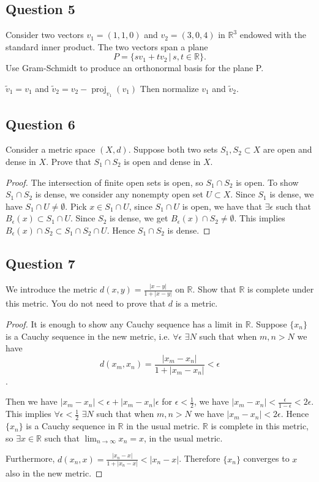 \documentclass{tufte-book}
\DeclareMathOperator{\proj}{proj}
\theoremstyle{mytheoremstyle}
\theoremstyle{mylemstyle}
\theoremstyle{mydefstyle}
\begin{document}
\subsection{Question 5}
Consider two vectors $v_1=(1,1,0)$ and $v_2=(3,0,4)$ in $\mathbb{R}^3$ endowed with the standard inner product.  The two vectors span a plane
\[ P = \{sv_1 + tv_2 \,|\, s,t \in \mathbb{R} \}. \]
Use Gram-Schmidt to produce an orthonormal basis for the plane P.

$\tilde{v}_1 = v_1$ and $\tilde{v}_2 = v_2 - \proj_{v_1}(v_1)$
Then normalize $v_1$ and $\tilde{v}_2$.
\subsection{Question 6}
Consider a metric space $(X,d)$.  Suppose both two sets $S_1, S_2 \subset X$ are open and dense in $X$.  Prove that $S_1 \cap S_2$ is open and dense in $X$.

\begin{proof}
The intersection of finite open sets is open, so $S_1 \cap S_2$ is open.  To show $S_1 \cap S_2$ is dense, we consider any nonempty open set $U \subset X$.  Since $S_1$ is dense, we have $S_1 \cap U \neq \emptyset$.  Pick $x \in S_1 \cap U$, since $S_1 \cap U$ is open, we have that $\exists \epsilon$ such that $B_\epsilon(x) \subset S_1 \cap U$.  Since $S_2$ is dense, we get $B_\epsilon(x) \cap S_2 \neq \emptyset$.  This implies $B_\epsilon(x) \cap S_2 \subset S_1 \cap S_2 \cap U$.  Hence $S_1 \cap S_2$ is dense.
\end{proof}

\subsection{Question 7}
We introduce the metric $d(x,y) = \frac{|x-y|}{1+ |x-y|}$ on $\mathbb{R}$.  Show that $\mathbb{R}$ is complete under this metric.  You do not need to prove that $d$ is a metric.

\begin{proof}

It is enough to show any Cauchy sequence has a limit in $\mathbb{R}$.  Suppose $\{x_n\}$ is a Cauchy sequence in the new metric, i.e. $\forall \epsilon$ $\exists N$ such that when $m,n > N$ we have
\[ d(x_m, x_n) = \frac{|x_m - x_n|}{1+|x_m-x_n|} < \epsilon \].

Then we have $|x_m - x_n| < \epsilon + |x_m-x_n|\epsilon$ for $\epsilon < \frac{1}{2}$, we have $|x_m-x_n| < \frac{\epsilon}{1-\epsilon} < 2\epsilon$.   This implies $\forall \epsilon < \frac{1}{2}$ $\exists N$ such that when $m, n > N$ we have $|x_m - x_n| < 2\epsilon$.  Hence $\{x_n\}$ is a Cauchy sequence in $\mathbb{R}$ in the usual metric. $\mathbb{R}$ is complete in this metric, so $\exists x \in \mathbb{R}$ such that $\lim_{n \to \infty}x_n = x$, in the usual metric.

Furthermore, $d(x_n, x) = \frac{|x_n -x|}{1+|x_n-x|} < |x_n-x|$.  Therefore $\{x_n\}$ converges to $x$ also in the new metric.

\end{proof}
\end{document}
